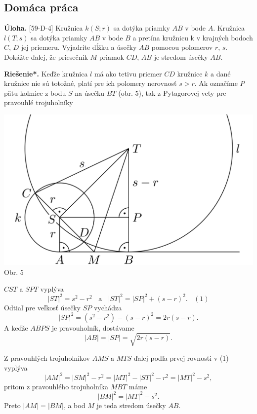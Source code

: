 \documentclass[11pt,a4paper,oneside,final]{book}
\newcommand{\ul}{\textbf{Úloha.} }
\newcommand{\rieh}{\textbf{Riešenie*.} }
\begin{document}
\subsection*{Domáca práca}
\begin{tcolorbox}[breakable,notitle,boxrule=0pt,colback=light-gray,colframe=light-gray]\ul [59-D-4] Kružnica $k(S; r)$ sa dotýka priamky $AB$ v bode $A$. Kružnica $l(T; s)$ sa dotýka priamky $AB$ v bode $B$ a pretína kružnicu k v krajných bodoch $C$, $D$ jej priemeru. Vyjadrite dĺžku a úsečky $AB$ pomocou polomerov $r$, $s$. Dokážte ďalej, že priesečník $M$ priamok $CD$, $AB$ je stredom úsečky $AB$.

\end{tcolorbox}

\rieh Keďže kružnica $l$ má ako tetivu priemer $CD$ kružnice $k$ a dané kružnice nie sú totožné, platí pre ich polomery nerovnosť $s > r$. Ak označíme $P$ pätu kolmice z bodu $S$ na úsečku $BT$ (obr. 5), tak z Pytagorovej vety pre pravouhlé trojuholníky
\begin{center}
\includegraphics{59D4}\\

Obr. 5
\end{center}
$CST$ a $SPT$ vyplýva
$$|ST|^2 = s^2 - r^2\ \ \ \ \text{a} \ \ \ \  |ST|^2 = |SP|^2 + (s -r)^2. \ \ \ \  (1)$$
Odtiaľ pre veľkosť úsečky $SP$ vychádza
$$|SP|^2 = (s^2 - r^2 ) - (s - r)^2 = 2r(s - r).$$
A keďže $ABPS$ je pravouholník, dostávame
$$|AB| = |SP| =\sqrt{2r(s - r)}.$$

Z pravouhlých trojuholníkov $AMS$ a $MTS$ ďalej podľa prvej rovnosti v (1) vyplýva
$$|AM|^2 = |SM|^2 - r^2 = |MT|^2- |ST|^2 - r^2 = |MT|^2 -s^2,$$
pritom z pravouhlého trojuholníka $MBT$ máme
$$|BM|^2 = |MT|^2 - s^2.$$
Preto $|AM| = |BM|$, a bod $M$ je teda stredom úsečky $AB$.
\end{document}
